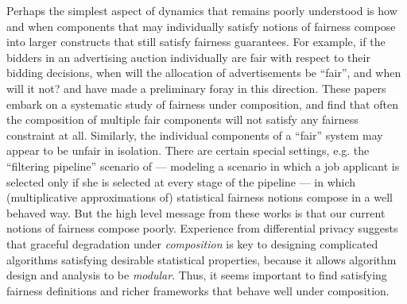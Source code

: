 Perhaps the simplest aspect of dynamics that remains poorly understood is how and when components that may individually satisfy notions of fairness compose into larger constructs that still satisfy fairness guarantees. For example, if the bidders in an advertising auction individually are fair with respect to their bidding decisions, when will the allocation of advertisements be ``fair'', and when will it not? \cite{pipelines} and \cite{DI18} have made a preliminary foray in this direction. These papers embark on a systematic study of fairness under composition, and find that often the composition of multiple fair components will not satisfy any fairness constraint at all. Similarly, the individual components of a ``fair'' system may appear to be unfair in isolation. There are certain special settings, e.g. the ``filtering pipeline'' scenario of \cite{pipelines} --- modeling a scenario in which a job applicant is selected only if she is selected at every stage of the pipeline --- in which (multiplicative approximations of) statistical fairness notions compose in a well behaved way. But the high level message from these works is that our current notions of fairness compose poorly. Experience from differential privacy \cite{DMNS06,DR14} suggests that graceful degradation under \emph{composition} is key to designing complicated algorithms satisfying desirable statistical properties, because it allows algorithm design and analysis to be \emph{modular}. Thus, it seems important to find satisfying fairness definitions and richer frameworks that behave well under composition.


